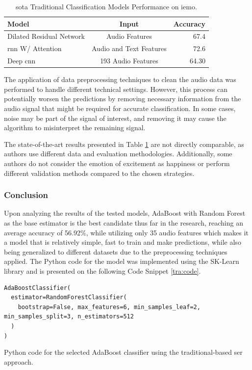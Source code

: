 \begin{table}[H]
	\centering
	\caption{\ac{sota} Traditional Classification Models Performance on \ac{iemo}.}
	\label{tab:modelssoa}
	\begin{tabular}{lcr}
		\toprule
		Model                        &   Input &   Accuracy \\
		\midrule
		
		Dilated Residual Network \cite{Li_2019}	& Audio Features & 67.4 \\
		
		\ac{rnn} W/ Attention \cite{Lu_2020} & Audio and Text Features & 72.6 \\
		
		Deep \ac{cnn} \cite{Issa_2020} & 193 Audio Features & 64.30 \\
		
		\bottomrule
	\end{tabular}
\end{table}


The application of data preprocessing techniques to clean the audio data was performed to handle different technical settings. However, this process can potentially worsen the predictions by removing necessary information from the audio signal that might be required for accurate classification. In some cases, noise may be part of the signal of interest, and removing it may cause the algorithm to misinterpret the remaining signal.

The state-of-the-art results presented in Table \ref{tab:modelssoa} are not directly comparable, as authors use different data and evaluation methodologies. Additionally, some authors do not consider the emotion of excitement as happiness or perform different validation methods compared to the chosen strategies.

\subsubsection{Conclusion}

Upon analyzing the results of the tested models, AdaBoost with Random Forest as the base estimator is the best candidate thus far in the research, reaching an average accuracy of 56.92\%, while utilizing only 35 audio features which makes it a model that is relatively simple, fast to train and make predictions, while also being generalized to different datasets due to the preprocessing techniques applied. The Python code for the model was implemented using the SK-Learn library and is presented on the following  Code Snippet \ref{tra:code}.

\begin{listing}[H]
	\begin{verbatim}
AdaBoostClassifier(
  estimator=RandomForestClassifier(
    bootstrap=False, max_features=6, min_samples_leaf=2, min_samples_split=3, n_estimators=512
  )
)
	\end{verbatim}
	\caption{Python code for the selected AdaBoost classifier using the traditional-based \ac{ser} approach.}
	\label{tra:code}
\end{listing}